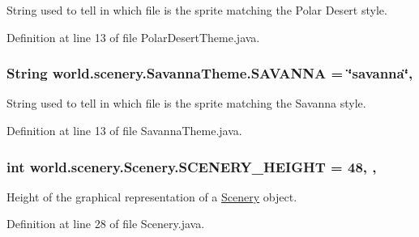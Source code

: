 String used to tell in which file is the sprite matching the Polar Desert style. 



Definition at line 13 of file Polar\-Desert\-Theme.\-java.

\hypertarget{interfaceworld_1_1scenery_1_1_savanna_theme_a69e8a9867db3a93074a41573940424b2}{
\subsubsection[{S\-A\-V\-A\-N\-N\-A}]{\setlength{\rightskip}{0pt plus 5cm}String world.\-scenery.\-Savanna\-Theme.\-S\-A\-V\-A\-N\-N\-A = \char`\"{}savanna\char`\"{}\hspace{0.3cm}{\ttfamily [static]}, {\ttfamily [inherited]}}}\label{interfaceworld_1_1scenery_1_1_savanna_theme_a69e8a9867db3a93074a41573940424b2}


String used to tell in which file is the sprite matching the Savanna style. 



Definition at line 13 of file Savanna\-Theme.\-java.

\hypertarget{classworld_1_1scenery_1_1_scenery_a106e53ae6e1647395740237ccce7f363}{
\subsubsection[{S\-C\-E\-N\-E\-R\-Y\-\_\-\-H\-E\-I\-G\-H\-T}]{\setlength{\rightskip}{0pt plus 5cm}int world.\-scenery.\-Scenery.\-S\-C\-E\-N\-E\-R\-Y\-\_\-\-H\-E\-I\-G\-H\-T = 48\hspace{0.3cm}{\ttfamily [static]}, {\ttfamily [protected]}, {\ttfamily [inherited]}}}\label{classworld_1_1scenery_1_1_scenery_a106e53ae6e1647395740237ccce7f363}


Height of the graphical representation of a \hyperlink{classworld_1_1scenery_1_1_scenery}{Scenery} object. 



Definition at line 28 of file Scenery.\-java.



